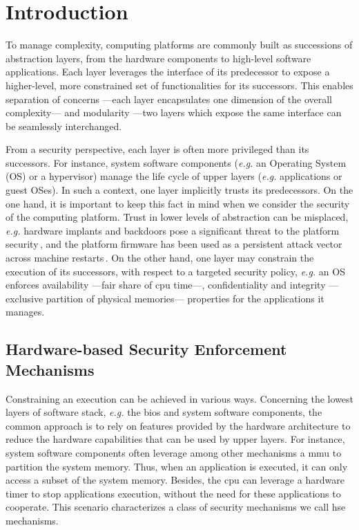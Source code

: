 \chapter{Introduction}
\label{chapter:introduction}


\vspace{1cm}\noindent
%
To manage complexity, computing platforms are commonly built as successions of
abstraction layers, from the hardware components to high-level software
applications.
%
Each layer leverages the interface of its predecessor to expose a higher-level,
more constrained set of functionalities for its successors.
%
This enables separation of concerns ---each layer encapsulates one dimension of
the overall complexity--- and modularity ---two layers which expose the same
interface can be seamlessly interchanged.

From a security perspective, each layer is often more privileged than its
successors.
%
For instance, system software components (\emph{e.g.} an Operating System (OS)
or a hypervisor) manage the life cycle of upper layers (\emph{e.g.} applications
or guest OSes).
%
In such a context, one layer implicitly trusts its predecessors.
%
On the one hand, it is important to keep this fact in mind when we consider the
security of the computing platform.
%
Trust in lower levels of abstraction can be misplaced, \emph{e.g.} hardware
implants and backdoors pose a significant threat to the platform
security\,\cite{yang2016a2}, and the platform firmware has been used as a
persistent attack vector across machine restarts\,\cite{embleton2013smm}.
%
On the other hand, one layer may constrain the execution of its successors, with
respect to a targeted security policy, \emph{e.g.}  an OS enforces
availability ---fair share of \ac{cpu} time---, confidentiality and integrity
---exclusive partition of physical memories--- properties for the applications
it manages.

\section{Hardware-based Security Enforcement Mechanisms}

Constraining an execution can be achieved in various ways.
%
Concerning the lowest layers of software stack, \emph{e.g.} the \ac{bios} and
system software components, the common approach is to rely on features provided
by the hardware architecture to reduce the hardware capabilities that can be
used by upper layers.
%
For instance, system software components often leverage among other mechanisms a
\ac{mmu} to partition the system memory.
%
Thus, when an application is executed, it can only access a subset of the system
memory.
%
Besides, the \ac{cpu} can leverage a hardware timer to stop applications
execution, without the need for these applications to cooperate.
%
This scenario characterizes a class of security mechanisms we call \ac{hse}
mechanisms.

